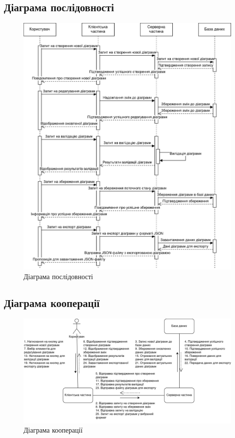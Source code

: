 \documentclass[oneside,14pt]{extarticle}
\begin{document}
\begin{normalsize}
	\subsection{Діаграма послідовності}
	\begin{figure}[H]
		\centering
		\includegraphics[width=\columnwidth]{2}
		\caption{Діаграма послідовності}
	\end{figure}
	
	\subsection{Діаграма кооперації}
	\begin{figure}[H]
		\centering
		\includegraphics[width=\columnwidth]{3}
		\caption{Діаграма кооперації}
	\end{figure}
	

\end{normalsize}
\end{document}
